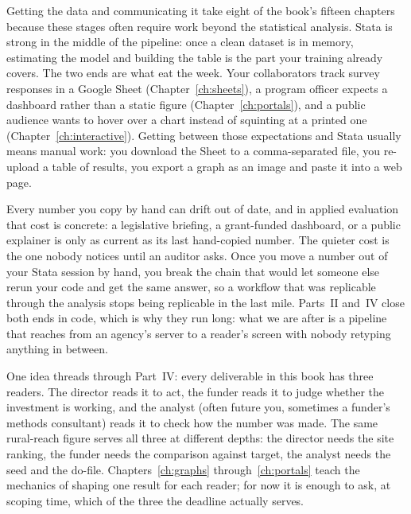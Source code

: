 Getting the data and communicating it take eight of the book's fifteen chapters because these stages often require work beyond the statistical analysis. Stata is strong in the middle of the pipeline: once a clean dataset is in memory, estimating the model and building the table is the part your training already covers. The two ends are what eat the week. Your collaborators track survey responses in a Google Sheet (Chapter~\ref{ch:sheets}), a program officer expects a dashboard rather than a static figure (Chapter~\ref{ch:portals}), and a public audience wants to hover over a chart instead of squinting at a printed one (Chapter~\ref{ch:interactive}). Getting between those expectations and Stata usually means manual work: you download the Sheet to a comma-separated file, you re-upload a table of results, you export a graph as an image and paste it into a web page.

Every number you copy by hand can drift out of date, and in applied evaluation that cost is concrete: a legislative briefing, a grant-funded dashboard, or a public explainer is only as current as its last hand-copied number. The quieter cost is the one nobody notices until an auditor asks. Once you move a number out of your Stata session by hand, you break the chain that would let someone else rerun your code and get the same answer, so a workflow that was replicable through the analysis stops being replicable in the last mile. Parts~II and~IV close both ends in code, which is why they run long: what we are after is a pipeline that reaches from an agency's server to a reader's screen with nobody retyping anything in between.

One idea threads through Part~IV: every deliverable in this book has three readers. The director reads it to act, the funder reads it to judge whether the investment is working, and the analyst (often future you, sometimes a funder's methods consultant) reads it to check how the number was made. The same rural-reach figure serves all three at different depths: the director needs the site ranking, the funder needs the comparison against target, the analyst needs the seed and the do-file. Chapters~\ref{ch:graphs} through~\ref{ch:portals} teach the mechanics of shaping one result for each reader; for now it is enough to ask, at scoping time, which of the three the deadline actually serves.

